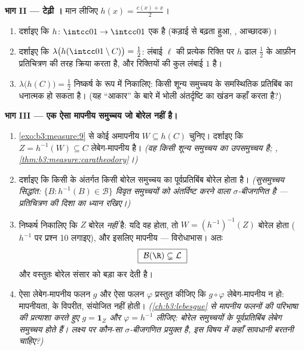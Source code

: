\begin{problem}
\medskip
\noindent\textbf{भाग II --- टेढ़ी ।} मान लीजिए $h(x) = \frac{c(x) + x}{2}$।
\begin{enumerate}[resume]
  \item दर्शाइए कि $h \colon \intcc01 \to \intcc01$ एक  है (कड़ाई से बढ़ता हुआ,
        , आच्छादक)।
  \item दर्शाइए कि $\lambda\bigl(h(\intcc01\setminus C)\bigr) =
        \tfrac12$: लंबाई $\ell$ की प्रत्येक रिक्ति पर $h$
        ढाल $\tfrac12$ के आफ़ीन प्रतिचित्रण की तरह क्रिया करता है, और
        रिक्तियों की कुल लंबाई $1$ है।
  \item $\lambda\bigl(h(C)\bigr) = \tfrac12$ निष्कर्ष के रूप में निकालिए: किसी शून्य समुच्चय के
        समस्थितिक प्रतिबिंब का  धनात्मक हो सकता है। (यह
        ``आकार'' के बारे में भोली अंतर्दृष्टि का खंडन कहाँ करता
        है?)
\end{enumerate}

\medskip
\noindent\textbf{भाग III --- एक ऐसा मापनीय समुच्चय जो बोरेल नहीं
है।}
\begin{enumerate}[resume]
  \item \cref{exo:b3:measure:9} से कोई अमापनीय $W
        \subseteq h(C)$ चुनिए। दर्शाइए कि $Z = h^{-1}(W) \subseteq C$
        लेबेग-मापनीय है। \emph{(वह किसी शून्य समुच्चय का
        उपसमुच्चय है; , \cref{thm:b3:measure:caratheodory}।)}
  \item दर्शाइए कि किसी  के अंतर्गत किसी बोरेल
        समुच्चय का पूर्वप्रतिबिंब बोरेल होता है। \emph{(सुसमुच्चय
        सिद्धांत: $\{B : h^{-1}(B) \in \mathcal B\}$ विवृत समुच्चयों को अंतर्विष्ट करने वाला
        $\sigma$-बीजगणित है --- प्रतिचित्रण की दिशा का ध्यान
        रखिए।)}
  \item निष्कर्ष निकालिए कि $Z$ बोरेल \emph{नहीं} है: यदि वह
        होता, तो $W = (h^{-1})^{-1}(Z)$ बोरेल होता ( $h^{-1}$ पर प्रश्न 10
        लगाइए), और इसलिए मापनीय --- विरोधाभास। अतः
        \[
        \boxed{\ \mathcal B(\R) \subsetneq \mathcal L\ }
        \]
        और  वस्तुतः बोरेल संसार को बड़ा कर देती है।
  \item ऐसा लेबेग-मापनीय फलन $g$ और ऐसा  फलन $\varphi$
        प्रस्तुत कीजिए कि $g \circ
        \varphi$ लेबेग-मापनीय न हो: मापनीयता,
         के विपरीत, संयोजित नहीं होती। \emph{(\cref{ch:b3:lebesgue} से
        मापनीय फलनों की परिभाषा की प्रत्याशा करते हुए $g =
        \mathbf 1_Z$ और
        $\varphi = h^{-1}$ लीजिए: बोरेल समुच्चयों के पूर्वप्रतिबिंब लेबेग
        समुच्चय होते हैं। लक्ष्य पर कौन-सा $\sigma$-बीजगणित प्रयुक्त
        है, इस विषय में कहाँ सावधानी बरतनी चाहिए?)}
\end{enumerate}


\end{problem}
